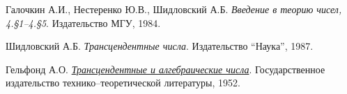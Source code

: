 \thispagestyle{supplementary}

\begin{thebibliography}{3}
        Галочкин А.И., Нестеренко Ю.В., Шидловский А.Б. 
        \textit{Введение в теорию чисел, 4.\S1--4.\S5}. 
        Издательство МГУ, 1984.

        Шидловский А.Б. 
        \textit{Трансцендентные числа}. 
        Издательство ``Наука'', 1987.

        Гельфонд А.О.  
        \href{https://ikfia.ysn.ru/wp-content/uploads/2018/01/Gelfond1952ru.pdf}{\textit{Трансцендентные и алгебраические числа}}. 
        Государственное издательство технико--теоретической литературы, 1952.
\end{thebibliography}
